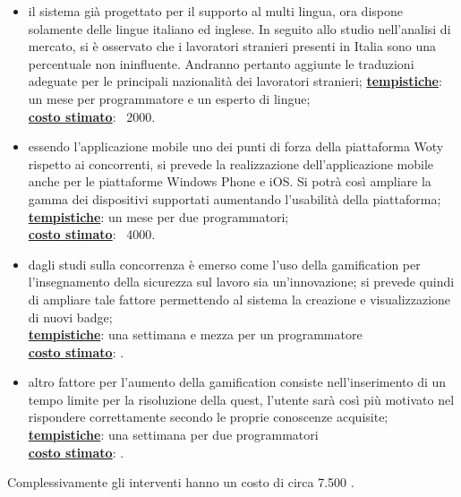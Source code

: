 \begin{itemize}
\item il sistema già progettato per il supporto al multi lingua, ora dispone solamente delle lingue italiano ed inglese. In seguito allo studio nell'analisi di mercato, si è osservato che i lavoratori stranieri presenti in Italia sono una percentuale non ininfluente. Andranno pertanto aggiunte le traduzioni adeguate per le principali nazionalità dei lavoratori stranieri;
\underline{\textbf{tempistiche}}: un mese per programmatore e un esperto di lingue;\\
\underline{\textbf{costo stimato}}: \EUR \ 2000.


\item essendo l'applicazione mobile uno dei punti di forza della piattaforma Woty rispetto ai concorrenti, si prevede la realizzazione dell'applicazione mobile anche per le piattaforme Windows Phone e iOS.
Si potrà così ampliare la gamma dei dispositivi supportati aumentando l'usabilità della piattaforma;\\
\underline{\textbf{tempistiche}}: un mese per due programmatori;\\
\underline{\textbf{costo stimato}}: \EUR \ 4000.


\item dagli studi sulla concorrenza è emerso come l'uso della gamification per l'insegnamento della sicurezza sul lavoro sia un'innovazione; si prevede quindi di ampliare tale fattore permettendo al sistema la creazione e visualizzazione di nuovi badge;\\
\underline{\textbf{tempistiche}}: una settimana e mezza per un programmatore\\
\underline{\textbf{costo stimato}}: .


\item altro fattore per l'aumento della gamification consiste nell'inserimento di un tempo limite per la risoluzione della quest, l'utente sarà così più motivato nel rispondere correttamente secondo le proprie conoscenze acquisite;\\
\underline{\textbf{tempistiche}}: una settimana per due programmatori\\
\underline{\textbf{costo stimato}}: .

\end{itemize}


Complessivamente gli interventi hanno un costo di circa 7.500 \EUR.





